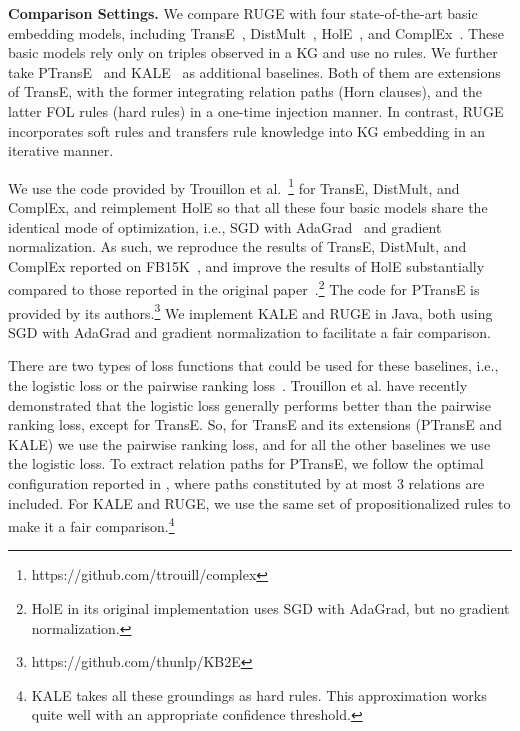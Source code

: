 \documentclass[letterpaper]{article} \usepackage{aaai18}  \usepackage{times}  \usepackage{helvet}  \usepackage{courier}  \usepackage{url}  \usepackage{graphicx}  \usepackage{amsmath}
\begin{document}
\smallskip
\noindent\textbf{Comparison Settings.} We compare RUGE with four state-of-the-art basic embedding models, including TransE~\cite{bordes2013:TransE}, DistMult~\cite{yang2015:DistMult}, HolE~\cite{nickel2016:HolE}, and ComplEx~\cite{trouillon2016:ComplEx}. These basic models rely only on triples observed in a KG and use no rules. We further take PTransE~\cite{lin2015:PTransE} and KALE~\cite{guo2016:KALE} as additional baselines. Both of them are extensions of TransE, with the former integrating relation paths (Horn clauses), and the latter FOL rules (hard rules) in a one-time injection manner. In contrast, RUGE incorporates soft rules and transfers rule knowledge into KG embedding in an iterative manner.

We use the code provided by Trouillon et al.~\footnote{https://github.com/ttrouill/complex} for TransE, DistMult, and ComplEx, and reimplement HolE so that all these four basic models share the identical mode of optimization, i.e., SGD with AdaGrad~\cite{duchi2011:AdaGrad} and gradient normalization. As such, we reproduce the results of TransE, DistMult, and ComplEx reported on FB15K~\cite{trouillon2016:ComplEx}, and improve the results of HolE substantially compared to those reported in the original paper~\cite{nickel2016:HolE}.\footnote{HolE in its original implementation uses SGD with AdaGrad, but no gradient normalization.} The code for PTransE is provided by its authors.\footnote{https://github.com/thunlp/KB2E} We implement KALE and RUGE in Java, both using SGD with AdaGrad and gradient normalization to facilitate a fair comparison.

There are two types of loss functions that could be used for these baselines, i.e., the logistic loss or the pairwise ranking loss~\cite{nickel2016:HolE}. Trouillon et al.  have recently demonstrated that the logistic loss generally performs better than the pairwise ranking loss, except for TransE. So, for TransE and its extensions (PTransE and KALE) we use the pairwise ranking loss, and for all the other baselines we use the logistic loss. To extract relation paths for PTransE, we follow the optimal configuration reported in \cite{lin2015:PTransE}, where paths constituted by at most 3 relations are included. For KALE and RUGE, we use the same set of propositionalized rules to make it a fair comparison.\footnote{KALE takes all these groundings as hard rules. This approximation works quite well with an appropriate confidence threshold.}
\end{document}
